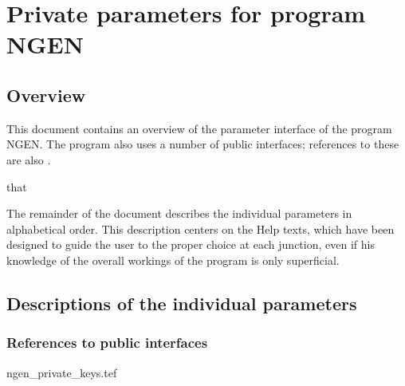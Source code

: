
\chapter{ Private parameters for program NGEN}
\tableofcontents


\section{ Overview}

	This document contains an overview of the parameter interface of the
program NGEN. The program also uses a number of public interfaces; references
to these are also .

that %


	The remainder of the document describes the individual parameters in
alphabetical order. This description centers on the Help texts, which have been
designed to guide the user to the proper choice at each junction, even if his
knowledge of the overall workings of the program is only superficial.


\section{ Descriptions of the individual parameters}
\label{.descriptions}

\subsection{ References to public interfaces}
\label{.public}

 {ngen_private_keys.tef}
